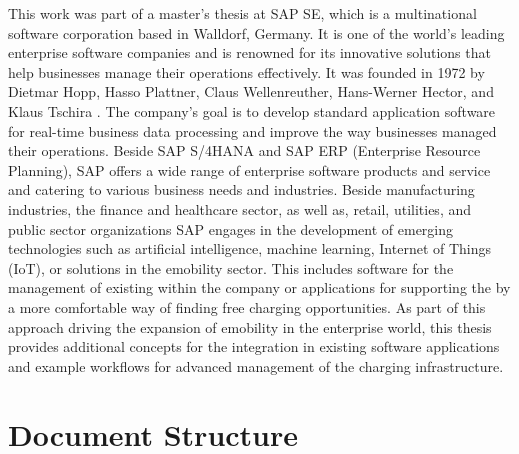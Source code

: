 This work was part of a master's thesis at SAP SE, which is a multinational software corporation based in Walldorf, Germany. It is one of the world's leading enterprise software companies and is renowned for its innovative solutions that help businesses manage their operations effectively. It was founded in 1972 by Dietmar Hopp, Hasso Plattner, Claus Wellenreuther, Hans-Werner Hector, and Klaus Tschira \cite{noauthor_inventing_nodate}. 
The company's goal is to develop standard application software for real-time business data processing and improve the way businesses managed their operations. Beside SAP S/4HANA and SAP ERP (Enterprise Resource Planning), SAP offers a wide range of enterprise software products and service and catering to various business needs and industries.
Beside manufacturing industries, the finance and healthcare sector, as well as, retail, utilities, and public sector organizations SAP engages in the development of emerging technologies such as artificial intelligence, machine learning, Internet of Things (IoT), or solutions in the \Gls{emobility} sector.
This includes software for the management of existing  within the company or applications for supporting the  by a more comfortable way of finding free charging opportunities. As part of this approach driving the expansion of \Gls{emobility} in the enterprise world, this thesis provides additional concepts for the integration in existing software applications and example workflows for advanced management of the charging infrastructure. 

\newpage

\section{Document Structure}
\label{ch:Introduction:Document Structure}

